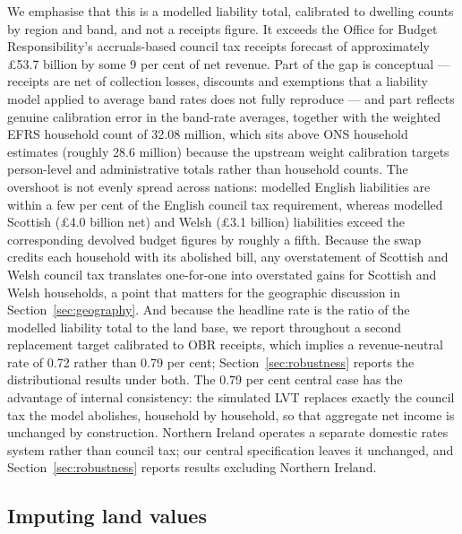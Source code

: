 We emphasise that this is a modelled liability total, calibrated to dwelling counts by region and band, and not a receipts figure. It exceeds the Office for Budget Responsibility's accruals-based council tax receipts forecast of approximately \pounds 53.7 billion \citep{obr2025} by some 9 per cent of net revenue. Part of the gap is conceptual --- receipts are net of collection losses, discounts and exemptions that a liability model applied to average band rates does not fully reproduce --- and part reflects genuine calibration error in the band-rate averages, together with the weighted EFRS household count of 32.08 million, which sits above ONS household estimates (roughly 28.6 million) because the upstream weight calibration targets person-level and administrative totals rather than household counts. The overshoot is not evenly spread across nations: modelled English liabilities are within a few per cent of the English council tax requirement, whereas modelled Scottish (\pounds 4.0 billion net) and Welsh (\pounds 3.1 billion) liabilities exceed the corresponding devolved budget figures by roughly a fifth. Because the swap credits each household with its abolished bill, any overstatement of Scottish and Welsh council tax translates one-for-one into overstated gains for Scottish and Welsh households, a point that matters for the geographic discussion in Section~\ref{sec:geography}. And because the headline rate is the ratio of the modelled liability total to the land base, we report throughout a second replacement target calibrated to OBR receipts, which implies a revenue-neutral rate of 0.72 rather than 0.79 per cent; Section~\ref{sec:robustness} reports the distributional results under both. The 0.79 per cent central case has the advantage of internal consistency: the simulated LVT replaces exactly the council tax the model abolishes, household by household, so that aggregate net income is unchanged by construction. Northern Ireland operates a separate domestic rates system rather than council tax; our central specification leaves it unchanged, and Section~\ref{sec:robustness} reports results excluding Northern Ireland.

\subsection{Imputing land values}
\label{sec:landvalues}

